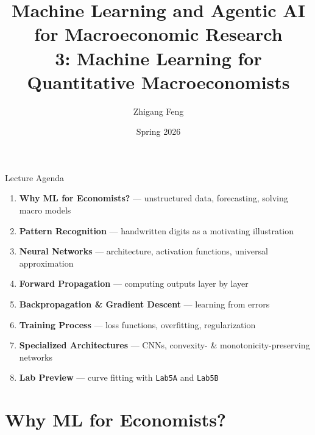 \documentclass[10pt,english,aspectratio=169]{beamer}
\title[ML \& Agentic AI for Macro Research]{Machine Learning and Agentic AI for Macroeconomic Research\\
3: Machine Learning for Quantitative Macroeconomists\\[0.5em]}
\author{Zhigang Feng}
\date{Spring 2026}
\newcommand\makebeamertitle{\frame{\maketitle}}%
\begin{document}
\makebeamertitle


\begin{frame}{Lecture Agenda}
\begin{enumerate}
  \item \textbf{Why ML for Economists?} --- unstructured data, forecasting, solving macro models
  \medskip
  \item \textbf{Pattern Recognition} --- handwritten digits as a motivating illustration
  \medskip
  \item \textbf{Neural Networks} --- architecture, activation functions, universal approximation
  \medskip
  \item \textbf{Forward Propagation} --- computing outputs layer by layer
  \medskip
  \item \textbf{Backpropagation \& Gradient Descent} --- learning from errors
  \medskip
  \item \textbf{Training Process} --- loss functions, overfitting, regularization
  \medskip
  \item \textbf{Specialized Architectures} --- CNNs, convexity- \& monotonicity-preserving networks
  \medskip
  \item \textbf{Lab Preview} --- curve fitting with \texttt{Lab5A} and \texttt{Lab5B}
\end{enumerate}
\end{frame}

\section{Why ML for Economists?}
\end{document}
